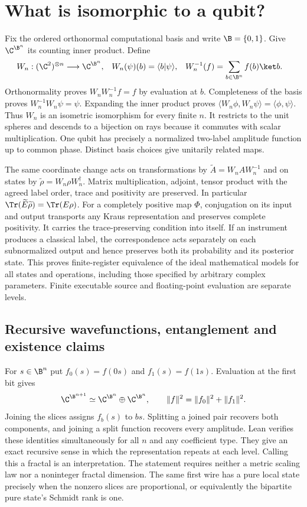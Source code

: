 \section{What is isomorphic to a qubit?}
\label{sec:math}
Fix the ordered orthonormal computational basis and write $\B=\{0,1\}$. Give $\C^{\B^n}$ its counting inner product. Define
\begin{align}
 W_n:(\C^2)^{\otimes n}&\longrightarrow\C^{\B^n},&
 W_n(\psi)(b)&=\langle b|\psi\rangle,&
 W_n^{-1}(f)&=\sum_{b\in\B^n}f(b)\ket b . \label{eq:isometry}
\end{align}
Orthonormality proves $W_nW_n^{-1}f=f$ by evaluation at $b$. Completeness of the basis proves $W_n^{-1}W_n\psi=\psi$. Expanding the inner product proves $\langle W_n\phi,W_n\psi\rangle=\langle\phi,\psi\rangle$. Thus $W_n$ is an isometric isomorphism for every finite $n$. It restricts to the unit spheres and descends to a bijection on rays because it commutes with scalar multiplication. One qubit has precisely a normalized two-label amplitude function up to common phase. Distinct basis choices give unitarily related maps.

The same coordinate change acts on transformations by $\widetilde A=W_n A W_n^{-1}$ and on states by $\widetilde\rho=W_n\rho W_n^\dagger$. Matrix multiplication, adjoint, tensor product with the agreed label order, trace and positivity are preserved. In particular $\Tr(\widetilde E\widetilde\rho)=\Tr(E\rho)$. For a completely positive map $\Phi$, conjugation on its input and output transports any Kraus representation and preserves complete positivity. It carries the trace-preserving condition into itself. If an instrument produces a classical label, the correspondence acts separately on each subnormalized output and hence preserves both its probability and its posterior state. This proves finite-register equivalence of the ideal mathematical models for all states and operations, including those specified by arbitrary complex parameters. Finite executable source and floating-point evaluation are separate levels.

\subsection{Recursive wavefunctions, entanglement and existence claims}
For $s\in\B^n$ put $f_0(s)=f(0s)$ and $f_1(s)=f(1s)$. Evaluation at the first bit gives
\[
 \C^{\B^{n+1}}\simeq \C^{\B^n}\oplus\C^{\B^n},\qquad
 \|f\|^2=\|f_0\|^2+\|f_1\|^2 .
\]
Joining the slices assigns $f_b(s)$ to $bs$. Splitting a joined pair recovers both components, and joining a split function recovers every amplitude. Lean verifies these identities simultaneously for all $n$ and any coefficient type. They give an exact recursive sense in which the representation repeats at each level. Calling this a fractal is an interpretation. The statement requires neither a metric scaling law nor a noninteger fractal dimension. The same first wire has a pure local state precisely when the nonzero slices are proportional, or equivalently the bipartite pure state's Schmidt rank is one.

